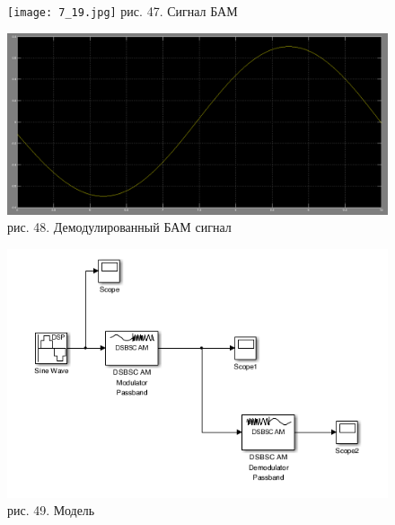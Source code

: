 \documentclass[10pt,a4paper]{report}
\begin{document}
\begin{figure}
\begin{center}
\texttt{[image: 7\_19.jpg]}\newline
рис. 47. Сигнал БАМ\newline
\end{center}
\end{figure}
\begin{figure}
\begin{center}
\includegraphics[width=150mm, scale = 0.9]{7_20.png}\newline
рис. 48. Демодулированный БАМ сигнал \newline
\end{center}
\end{figure}
\begin{figure}
\begin{center}
\includegraphics[width=150mm, scale = 0.9]{7_21.png}\newline
рис. 49. Модель\newline
\end{center}
\end{figure}
\end{document}
